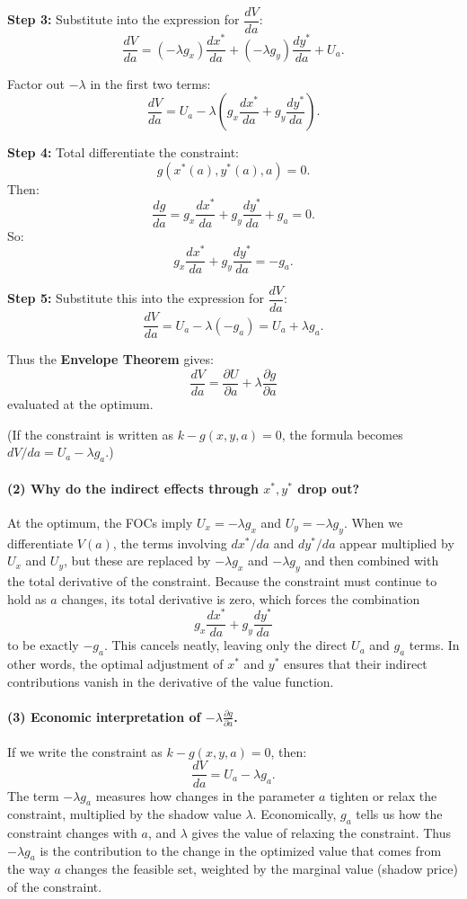 \documentclass[12pt]{article}
\begin{document}
\textbf{Step 3:} Substitute into the expression for $\dfrac{dV}{da}$:
\[
\frac{dV}{da}
= (-\lambda g_x)\frac{dx^*}{da}
+ (-\lambda g_y)\frac{dy^*}{da}
+ U_a.
\]

Factor out $-\lambda$ in the first two terms:
\[
\frac{dV}{da}
= U_a - \lambda \left( g_x \frac{dx^*}{da} + g_y \frac{dy^*}{da} \right).
\]

\textbf{Step 4:} Total differentiate the constraint:
\[
g(x^*(a),y^*(a),a) = 0.
\]
Then:
\[
\frac{dg}{da}
= g_x \frac{dx^*}{da} + g_y \frac{dy^*}{da} + g_a = 0.
\]
So:
\[
g_x \frac{dx^*}{da} + g_y \frac{dy^*}{da} = -g_a.
\]

\textbf{Step 5:} Substitute this into the expression for $\dfrac{dV}{da}$:
\[
\frac{dV}{da}
= U_a - \lambda (-g_a)
= U_a + \lambda g_a.
\]

Thus the \textbf{Envelope Theorem} gives:
\[
\boxed{
\frac{dV}{da} 
= \frac{\partial U}{\partial a} + \lambda \frac{\partial g}{\partial a}
}
\]
evaluated at the optimum.

(If the constraint is written as $k - g(x,y,a) = 0$, the formula becomes $dV/da = U_a - \lambda g_a$.)

\paragraph{(2) Why do the indirect effects through $x^*, y^*$ drop out?}

At the optimum, the FOCs imply $U_x = -\lambda g_x$ and $U_y = -\lambda g_y$. When we differentiate $V(a)$, the terms involving $dx^*/da$ and $dy^*/da$ appear multiplied by $U_x$ and $U_y$, but these are replaced by $-\lambda g_x$ and $-\lambda g_y$ and then combined with the total derivative of the constraint. Because the constraint must continue to hold as $a$ changes, its total derivative is zero, which forces the combination 
\[
g_x \frac{dx^*}{da} + g_y \frac{dy^*}{da}
\]
to be exactly $-g_a$. This cancels neatly, leaving only the direct $U_a$ and $g_a$ terms. In other words, the optimal adjustment of $x^*$ and $y^*$ ensures that their indirect contributions vanish in the derivative of the value function.
\newpage
\paragraph{(3) Economic interpretation of $-\lambda \frac{\partial g}{\partial a}$.}

If we write the constraint as $k - g(x,y,a) = 0$, then:
\[
\frac{dV}{da} = U_a - \lambda g_a.
\]
The term $-\lambda g_a$ measures how changes in the parameter $a$ tighten or relax the constraint, multiplied by the shadow value $\lambda$. Economically, $g_a$ tells us how the constraint changes with $a$, and $\lambda$ gives the value of relaxing the constraint. Thus $-\lambda g_a$ is the contribution to the change in the optimized value that comes from the way $a$ changes the feasible set, weighted by the marginal value (shadow price) of the constraint.
\end{document}
